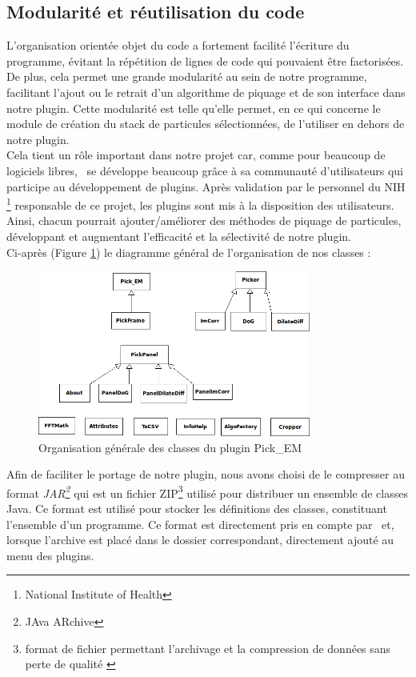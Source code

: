 \subsection{Modularité et réutilisation du code}

L'organisation orientée objet du code a fortement facilité l'écriture du programme, évitant la répétition de lignes de code qui pouvaient \^etre factorisées. De plus, cela permet une grande modularité au sein de notre programme, facilitant l'ajout ou le retrait d'un algorithme de piquage et de son interface dans notre plugin. Cette modularité est telle qu'elle permet, en ce qui concerne le module de création du stack de particules sélectionnées, de l'utiliser en dehors de notre plugin.\\
Cela tient un rôle important dans notre projet car, comme pour beaucoup de logiciels libres, \imj ~se développe beaucoup gr\^ace à sa communauté d'utilisateurs qui participe au développement de plugins. Après validation par le personnel du NIH \footnote{National Institute of Health} responsable de ce projet, les plugins sont mis à la disposition des utilisateurs. Ainsi, chacun pourrait ajouter/améliorer des méthodes de piquage de particules, développant et augmentant l'efficacité et la sélectivité de notre plugin. \\

Ci-après (Figure \ref{classes}) le diagramme général de l'organisation de nos classes :

\begin{figure}[!h] 
\begin{center}
\includegraphics[width=0.8\textwidth]{class_diagram.png}
\caption{Organisation générale des classes du plugin Pick\_EM}
\label{classes}
\end{center}
\end{figure}

Afin de faciliter le portage de notre plugin, nous avons choisi de le compresser au format \emph{JAR\footnote{JAva ARchive\cite{jar:url}}} qui est un fichier ZIP\footnote{format de fichier permettant l'archivage et la compression de données sans perte de qualité \cite{zip:url}} utilisé pour distribuer un ensemble de classes Java. Ce format est utilisé pour stocker les définitions des classes, constituant l'ensemble d'un programme.
Ce format est directement pris en compte par \imj ~et, lorsque l'archive est placé dans le dossier correspondant, directement ajouté au menu des plugins.\\

